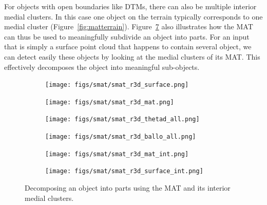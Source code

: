 For objects with open boundaries like DTMs, there can also be multiple interior medial clusters.
In this case one object on the terrain typically corresponds to one medial cluster (Figure~\ref{fig:matterrain}).
Figure~\ref{fig:smat_r3d_int} also illustrates how the MAT can thus be used to meaningfully subdivide an object into parts.
For an input that is simply a surface point cloud that happens to contain several object, we can detect easily these objects by looking at the medial clusters of its MAT.
This effectively decomposes the object into meaningful sub-objects.
\begin{figure}
	\begin{subfigure}[t]{0.45\linewidth}
		\texttt{[image: figs/smat/smat\_r3d\_surface.png]}
		\label{fig:smat_r3d_surface}
	\end{subfigure}
	\quad
	\begin{subfigure}[t]{0.45\linewidth}
		\texttt{[image: figs/smat/smat\_r3d\_mat.png]}
		\label{fig:smat_r3d_mat}
	\end{subfigure}
	\quad
	\begin{subfigure}[t]{0.45\linewidth}
		\texttt{[image: figs/smat/smat\_r3d\_thetad\_all.png]}
		\label{fig:smat_r3d_sheets_all}
	\end{subfigure}
	\quad
	\begin{subfigure}[t]{0.45\linewidth}
		\texttt{[image: figs/smat/smat\_r3d\_ballo\_all.png]}
		\label{fig:smat_r3d_ballo_all}
	\end{subfigure}
	\quad
	\begin{subfigure}[t]{0.45\linewidth}
		\texttt{[image: figs/smat/smat\_r3d\_mat\_int.png]}
		\label{fig:smat_r3d_ballo_int}
	\end{subfigure}
	\quad
	\begin{subfigure}[t]{0.45\linewidth}
		\texttt{[image: figs/smat/smat\_r3d\_surface\_int.png]}
		\label{fig:smat_r3d_surface_int}
	\end{subfigure}
	\caption{Decomposing an object into parts using the MAT and its interior medial clusters.}
	\label{fig:smat_r3d_int}
\end{figure}

